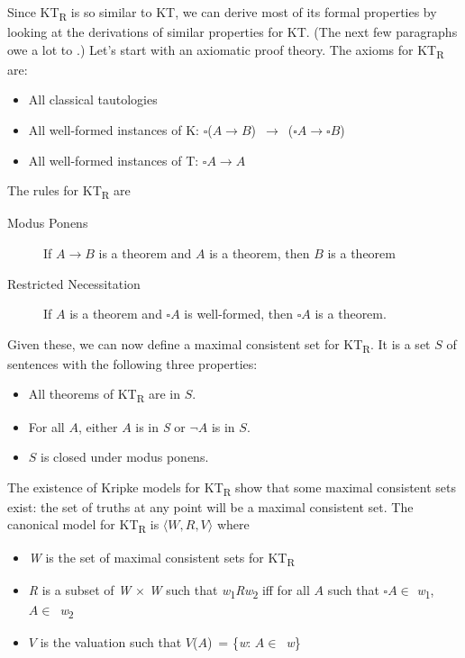 Since KT\textsubscript{R} is so similar to KT, we can derive most of its
formal properties by looking at the derivations of similar properties
for KT. (The next few paragraphs owe a lot to
\cite[Chs.1-3]{Goldblatt1992}.) Let's start with an axiomatic proof
theory. The axioms for KT\textsubscript{R} are:

\begin{itemize}
\item
  All classical tautologies
\item
  All well-formed instances of K:
  \(\square\)(\(A \rightarrow B\))~\(\rightarrow\)~(\(\square A \rightarrow \square B\))
\item
  All well-formed instances of T: \(\square A \rightarrow A\)
\end{itemize}

The rules for KT\textsubscript{R} are

\begin{description}
\item[Modus Ponens]
If \(A \rightarrow B\) is a theorem and \(A\) is a theorem, then \(B\)
is a theorem
\item[Restricted Necessitation]
If \(A\) is a theorem and \(\square A\) is well-formed, then
\(\square A\) is a theorem.
\end{description}

Given these, we can now define a maximal consistent set for
KT\textsubscript{R}. It is a set \(S\) of sentences with the following
three properties:

\begin{itemize}
\item
  All theorems of KT\textsubscript{R} are in \(S\).
\item
  For all \(A\), either \(A\) is in \emph{S} or \(\neg A\) is in \(S\).
\item
  \(S\) is closed under modus ponens.
\end{itemize}

The existence of Kripke models for KT\textsubscript{R} show that some
maximal consistent sets exist: the set of truths at any point will be a
maximal consistent set. The canonical model for KT\textsubscript{R} is
\(\langle W, R, V \rangle\) where

\begin{itemize}
\item
  \emph{W} is the set of maximal consistent sets for KT\textsubscript{R}
\item
  \emph{R} is a subset of \emph{W} \(\times\) \emph{W} such that
  \emph{w}\textsubscript{1}\emph{Rw}\textsubscript{2} iff for all \(A\)
  such that \(\square A \in\) \emph{w}\textsubscript{1},
  \(A \in\)~\emph{w}\textsubscript{2}
\item
  \(V\) is the valuation such that \(V\)(\(A\))~= \{\emph{w}:
  \(A \in\)~\emph{w}\}
\end{itemize}

